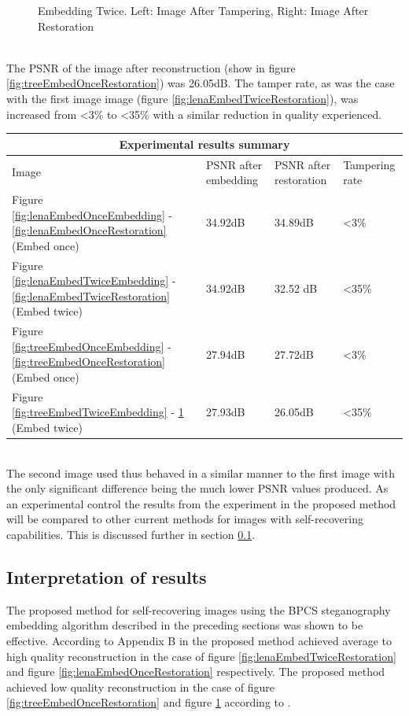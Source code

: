 \documentclass[12pt]{article}
\begin{document}
\begin{figure}[h]
{}%
\caption{Embedding Twice. Left: Image After Tampering, Right: Image After Restoration}
\label{fig:treeEmbedTwiceRestoration}
\end{figure}

\hspace{0pt} \\
The PSNR of the image after reconstruction (show in figure \ref{fig:treeEmbedOnceRestoration}) was 26.05dB.
The tamper rate, as was the case with the first image image (figure \ref{fig:lenaEmbedTwiceRestoration}), was increased from \textless 3\% to \textless 35\% with a similar reduction in quality experienced.
\begin{center}
  \begin{tabular}{| l | l | l | l |}
    \hline
    \multicolumn{4}{|c|}{Experimental results summary} \\
    \hline
    Image & PSNR after embedding & PSNR after restoration & Tampering rate \\ \hline
    Figure \ref{fig:lenaEmbedOnceEmbedding} - \ref{fig:lenaEmbedOnceRestoration} (Embed once) & 34.92dB & 34.89dB & \textless 3\% \\ \hline
    Figure \ref{fig:lenaEmbedTwiceEmbedding} - \ref{fig:lenaEmbedTwiceRestoration} (Embed twice) & 34.92dB & 32.52 dB & \textless 35\% \\ \hline
    Figure \ref{fig:treeEmbedOnceEmbedding} - \ref{fig:treeEmbedOnceRestoration} (Embed once) & 27.94dB & 27.72dB & \textless 3\% \\ \hline
    Figure \ref{fig:treeEmbedTwiceEmbedding} - \ref{fig:treeEmbedTwiceRestoration} (Embed twice) & 27.93dB & 26.05dB & \textless 35\% \\ \hline
    \hline
  \end{tabular}
\end{center}

\hspace{0pt} \\
The second image used thus behaved in a similar manner to the first image with the only significant difference being the much lower PSNR values produced. As an experimental control the results from the experiment in the proposed method will be compared to other current methods for images with self-recovering capabilities.
This is discussed further in  section \ref{interpretation}.

\subsection{Interpretation of results}
\label{interpretation}
The proposed method for self-recovering images using the BPCS steganography embedding algorithm described in the preceding sections was shown to be effective.
According to Appendix B in \cite{korus2013efficient} the proposed method achieved average to high quality reconstruction in the case of figure \ref{fig:lenaEmbedTwiceRestoration} and figure \ref{fig:lenaEmbedOnceRestoration} respectively.
The proposed method achieved low quality reconstruction in the case of figure \ref{fig:treeEmbedOnceRestoration} and figure \ref{fig:treeEmbedTwiceRestoration} according to \cite{korus2013efficient}.
\end{document}
